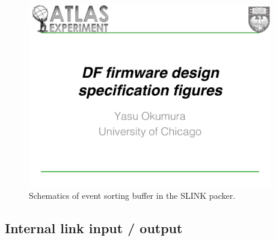 \documentclass[11pt,letterpaper]{article}
\begin{document}
\begin{figure}[h!]
  \centering
  \includegraphics[width=0.95\textwidth,clip,page=10]{figures.pdf}
  \caption{Schematics of event sorting buffer in the SLINK packer.}
  \label{fig:EVENT_SORTING_BUFFER}
\end{figure}

\subsection{Internal link input / output}
\end{document}
